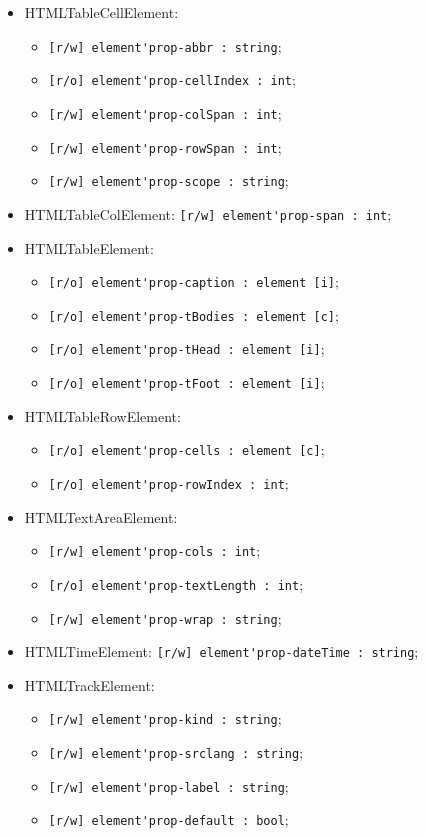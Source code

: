 \documentclass[a4paper, 14pt]{extarticle}
\newenvironment{icItems}
	{ \begin{itemize} [noitemsep,nolistsep] }
	{ \end{itemize} }
\begin{document}
\begin{icItems}
	\item HTMLTableCellElement:
	\begin{icItems}
		\item \lstinline|[r/w] element'prop-abbr : string|;
		\item \lstinline|[r/o] element'prop-cellIndex : int|;
		\item \lstinline|[r/w] element'prop-colSpan : int|;
		\item \lstinline|[r/w] element'prop-rowSpan : int|;
		\item \lstinline|[r/w] element'prop-scope : string|;
	\end{icItems}
	
	\item HTMLTableColElement: \lstinline|[r/w] element'prop-span : int|;
	
	\item HTMLTableElement:
	\begin{icItems}
		\item \lstinline|[r/o] element'prop-caption : element [i]|;
		\item \lstinline|[r/o] element'prop-tBodies : element [c]|;
		\item \lstinline|[r/o] element'prop-tHead : element [i]|;
		\item \lstinline|[r/o] element'prop-tFoot : element [i]|;
	\end{icItems}
	
	\item HTMLTableRowElement:
	\begin{icItems}
		\item \lstinline|[r/o] element'prop-cells : element [c]|;
		\item \lstinline|[r/o] element'prop-rowIndex : int|;
	\end{icItems}
	
	\item HTMLTextAreaElement:
	\begin{icItems}
		\item \lstinline|[r/w] element'prop-cols : int|;
		\item \lstinline|[r/o] element'prop-textLength : int|;
		\item \lstinline|[r/w] element'prop-wrap : string|;
	\end{icItems}
	
	\item HTMLTimeElement: \lstinline|[r/w] element'prop-dateTime : string|;
	
	\item HTMLTrackElement:
	\begin{icItems}
		\item \lstinline|[r/w] element'prop-kind : string|;
		\item \lstinline|[r/w] element'prop-srclang : string|;
		\item \lstinline|[r/w] element'prop-label : string|;
		\item \lstinline|[r/w] element'prop-default : bool|;
	\end{icItems}
	

\end{icItems}
\end{document}

